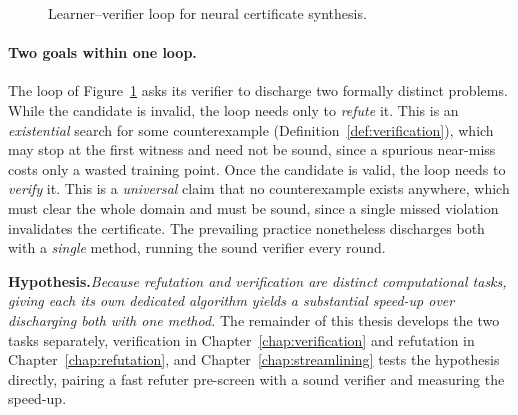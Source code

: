 \begin{figure}[t]
    \centering
    \caption{Learner--verifier loop for neural certificate synthesis.}
    \label{fig:cegis_certificate}
\end{figure}

\paragraph{Two goals within one loop.} The loop of
Figure~\ref{fig:cegis_certificate} asks its verifier to discharge two formally
distinct problems. While the candidate is invalid, the loop needs only to
\emph{refute} it. This is an \emph{existential} search for some counterexample
(Definition~\ref{def:verification}), which may stop at the first witness and need
not be sound, since a spurious near-miss costs only a wasted training point. Once
the candidate is valid, the loop needs to \emph{verify} it. This is a
\emph{universal} claim that no counterexample exists anywhere, which must clear
the whole domain and must be sound, since a single missed violation invalidates
the certificate. The prevailing practice nonetheless discharges both with a
\emph{single} method, running the sound verifier every round.

\medskip
\noindent\textbf{Hypothesis.}\enspace \emph{Because refutation and verification
are distinct computational tasks, giving each its own dedicated algorithm yields a substantial speed-up over discharging
both with one method.} The remainder of this thesis
develops the two tasks separately, verification in
Chapter~\ref{chap:verification} and refutation in Chapter~\ref{chap:refutation},
and Chapter~\ref{chap:streamlining} tests the hypothesis directly, pairing a fast
refuter pre-screen with a sound verifier and measuring the speed-up.


\newpage